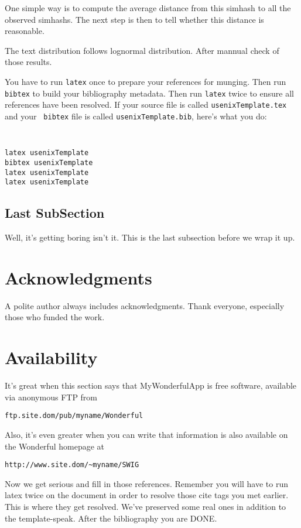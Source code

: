 \documentclass[letterpaper,twocolumn,10pt]{article}
\begin{document}
One simple way is to compute the average distance from this simhash to all the observed simhashs. The next step is then to tell whether this distance is reasonable. 

The text distribution follows lognormal distribution.
After mannual check of those results.




You have to run {\tt latex} once to prepare your references for
munging.  Then run {\tt bibtex} to build your bibliography metadata.
Then run {\tt latex} twice to ensure all references have been resolved.
If your source file is called {\tt usenixTemplate.tex} and your {\tt
  bibtex} file is called {\tt usenixTemplate.bib}, here's what you do:
{\tt \small
\begin{verbatim}
latex usenixTemplate
bibtex usenixTemplate
latex usenixTemplate
latex usenixTemplate
\end{verbatim}
}


\subsection{Last SubSection}

Well, it's getting boring isn't it.  This is the last subsection
before we wrap it up.

\section{Acknowledgments}

A polite author always includes acknowledgments.  Thank everyone,
especially those who funded the work. 

\section{Availability}

It's great when this section says that MyWonderfulApp is free software, 
available via anonymous FTP from

\begin{center}
{\tt ftp.site.dom/pub/myname/Wonderful}\\
\end{center}

Also, it's even greater when you can write that information is also 
available on the Wonderful homepage at 

\begin{center}
{\tt http://www.site.dom/\~{}myname/SWIG}
\end{center}

Now we get serious and fill in those references.  Remember you will
have to run latex twice on the document in order to resolve those
cite tags you met earlier.  This is where they get resolved.
We've preserved some real ones in addition to the template-speak.
After the bibliography you are DONE.

{\footnotesize 
}

\theendnotes
\end{document}
